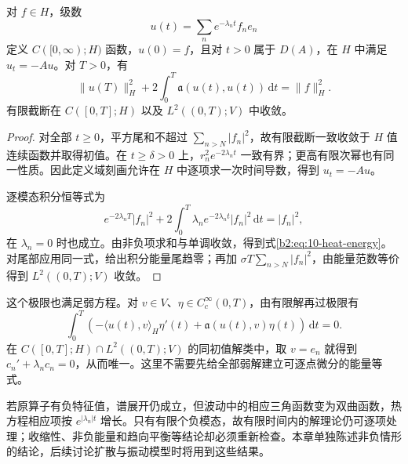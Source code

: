\begin{proposition}[热方程的平方能量极限]\label{b2:prop:10-heat-energy-limit}
对 \(f\in H\)，级数
\[
 u(t)=\sum_ne^{-\lambda_nt}f_ne_n
\]
定义 \(C([0,\infty);H)\) 函数，\(u(0)=f\)，且对 \(t>0\) 属于 \(D(A)\)，在 \(H\) 中满足 \(u_t=-Au\)。对 \(T>0\)，有
\begin{equation}\label{b2:eq:10-heat-energy}
 \|u(T)\|_H^2+2\int_0^T\mathfrak a(u(t),u(t))\,\mathrm{d}t
 =\|f\|_H^2.
\end{equation}
有限截断在 \(C([0,T];H)\) 以及 \(L^2((0,T);V)\) 中收敛。
\end{proposition}
\begin{proof}
对全部 \(t\geq0\)，平方尾和不超过 \(\sum_{n>N}|f_n|^2\)，故有限截断一致收敛于 \(H\) 值连续函数并取得初值。在 \(t\geq\delta>0\) 上，\(r_n^2e^{-2\lambda_nt}\) 一致有界；更高有限次幂也有同一性质。因此定义域刻画允许在 \(H\) 中逐项求一次时间导数，得到 \(u_t=-Au\)。

逐模态积分恒等式为
\[
 e^{-2\lambda_nT}|f_n|^2
 +2\int_0^T\lambda_ne^{-2\lambda_nt}|f_n|^2\,\mathrm{d}t
 =|f_n|^2,
\]
在 \(\lambda_n=0\) 时也成立。由非负项求和与单调收敛，得到式\eqref{b2:eq:10-heat-energy}。对尾部应用同一式，给出积分能量尾趋零；再加 \(\sigma T\sum_{n>N}|f_n|^2\)，由能量范数等价得到 \(L^2((0,T);V)\) 收敛。
\end{proof}

这个极限也满足弱方程。对 \(v\in V\)、\(\eta\in C_c^\infty(0,T)\)，由有限解再过极限有
\[
 \int_0^T\left(-\langle u(t),v\rangle_H\eta'(t)
 +\mathfrak a(u(t),v)\eta(t)\right)\,\mathrm{d}t=0.
\]
在 \(C([0,T];H)\cap L^2((0,T);V)\) 的同初值解类中，取 \(v=e_n\) 就得到 \(c_n'+\lambda_nc_n=0\)，从而唯一。这里不需要先给全部弱解建立可逐点微分的能量等式。

\ProseParagraphBreak

若原算子有负特征值，谱展开仍成立，但波动中的相应三角函数变为双曲函数，热方程相应项按 \(e^{|\lambda_n|t}\) 增长。只有有限个负模态，故有限时间内的解理论仍可逐项处理；收缩性、非负能量和趋向平衡等结论却必须重新检查。本章单独陈述非负情形的结论，后续讨论扩散与振动模型时将用到这些结果。
